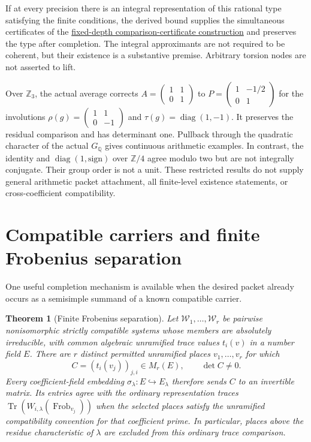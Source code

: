 \documentclass[11pt]{article}
\newtheorem{theorem}{Theorem}[section]
\theoremstyle{definition}
\theoremstyle{remark}
\begin{document}
If at every precision there is an integral representation of this rational
type satisfying the finite conditions, the derived bound supplies the
simultaneous certificates of the \hyperref[book:x-construction-15]{fixed-depth comparison-certificate construction} and preserves the type after completion.
The integral approximants are not required to be coherent, but their existence
is a substantive premise. Arbitrary torsion nodes are not asserted to lift.

Over $\mathbb Z_3$, the actual average corrects
$A=\left(\begin{smallmatrix}1&1\\0&1\end{smallmatrix}\right)$ to
$P=\left(\begin{smallmatrix}1&-1/2\\0&1\end{smallmatrix}\right)$ for the
involutions $\rho(g)=\left(\begin{smallmatrix}1&1\\0&-1\end{smallmatrix}\right)$
and $\tau(g)=\operatorname{diag}(1,-1)$. It preserves the residual comparison
and has determinant one. Pullback through the quadratic character of the
actual $G_{\mathbb Q}$ gives continuous arithmetic examples. In contrast, the
identity and $\operatorname{diag}(1,\mathrm{sign})$ over $\mathbb Z/4$ agree
modulo two but are not integrally conjugate. Their group order is not a unit.
These restricted results do not supply general arithmetic packet attachment,
all finite-level existence statements, or cross-coefficient compatibility.

\section{Compatible carriers and finite Frobenius separation}

One useful completion mechanism is available when the desired packet already occurs as a semisimple summand of a known compatible carrier.

\begin{theorem}[Finite Frobenius separation]\label{px:9.1}
Let $\mathscr W_1,\ldots,\mathscr W_r$ be pairwise nonisomorphic strictly
compatible systems whose members are absolutely irreducible, with common
algebraic unramified trace values $t_i(v)$ in a number field $E$.
There are $r$ distinct permitted unramified places $v_1,\ldots,v_r$ for which
\[
 C=(t_i(v_j))_{j,i}\in M_r(E),\qquad \det C\ne0.
\]
Every coefficient-field embedding $\sigma_\lambda:E\hookrightarrow E_\lambda$
therefore sends $C$ to an invertible matrix. Its entries agree with the
ordinary representation traces
$\operatorname{Tr}(W_{i,\lambda}(\operatorname{Frob}_{v_j}))$
when the selected places satisfy the unramified compatibility convention
for that coefficient prime. In particular, places above the residue
characteristic of $\lambda$ are excluded from this ordinary trace comparison.
\end{theorem}
\end{document}
